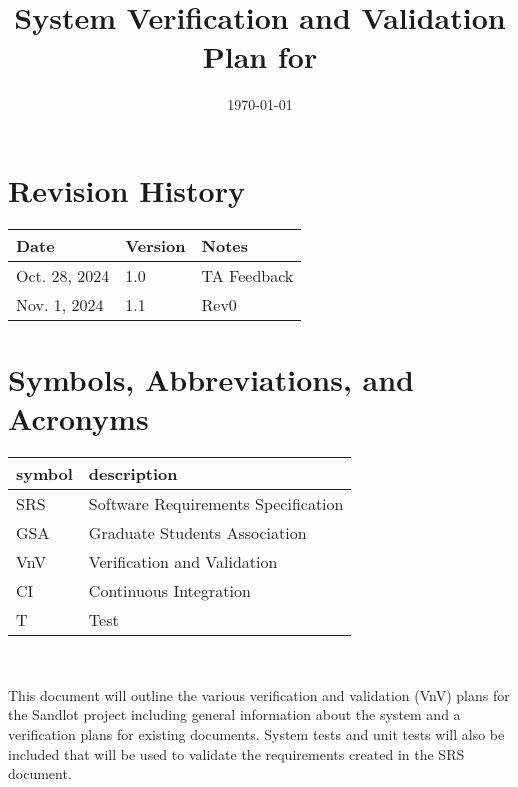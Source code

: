 \documentclass[12pt, titlepage]{article}
\begin{document}
\title{System Verification and Validation Plan for \progname{}} 
\author{\authname}
\date{\today}
	
\maketitle


\section*{Revision History}

\begin{tabularx}{\textwidth}{p{3cm}p{2cm}X}
\toprule {\bf Date} & {\bf Version} & {\bf Notes}\\
\midrule
Oct. 28, 2024 & 1.0 & TA Feedback\\
Nov. 1, 2024 & 1.1 & Rev0\\
\bottomrule
\end{tabularx}

\newpage

\tableofcontents

\newpage

\section{Symbols, Abbreviations, and Acronyms}

\renewcommand{\arraystretch}{1.2}
\begin{tabular}{l l} 
  \toprule		
  \textbf{symbol} & \textbf{description}\\
  \midrule 
  SRS & Software Requirements Specification\\
  GSA & Graduate Students Association\\
  VnV & Verification and Validation\\
  CI & Continuous Integration\\
  T & Test\\
  \bottomrule
\end{tabular}\\

\newpage


This document will outline the various verification and validation (VnV) plans
for the Sandlot project including general information about the system and a
verification plans for existing documents. System tests and unit tests will
also be included that will be used to validate the requirements created in the
SRS document.
\end{document}
